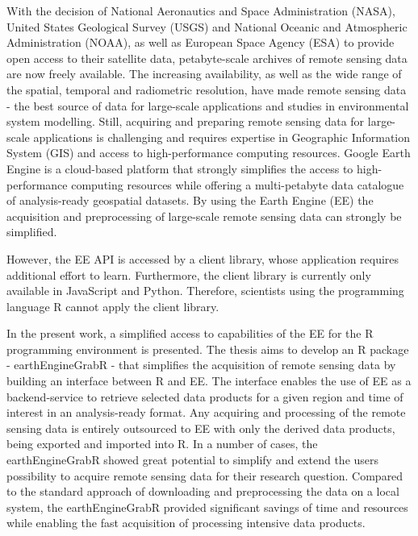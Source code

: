 
With the decision of National Aeronautics and Space Administration (NASA), United States Geological Survey (USGS) and National Oceanic and Atmospheric Administration (NOAA), as well as European Space Agency (ESA) to provide open access to their satellite data, petabyte-scale archives of remote sensing data are now freely available.
The increasing availability, as well as the wide range of the spatial, temporal  and radiometric resolution, have made remote sensing data - the best source of data for large-scale applications and studies in environmental system modelling.
Still, acquiring and preparing remote sensing data for large-scale applications is challenging and requires expertise in Geographic Information System (GIS) and access to high-performance computing resources.
Google Earth Engine is a cloud-based platform that strongly simplifies the access to high-performance computing resources while offering a multi-petabyte data catalogue of analysis-ready geospatial datasets.
By using the Earth Engine (EE) the acquisition and preprocessing of large-scale remote sensing data can strongly be simplified.

However, the EE API is accessed by a client library, whose application requires additional effort to learn. Furthermore, the client library is currently only available in JavaScript and Python. Therefore, scientists using the programming language R cannot apply the client library.

In the present work, a simplified access to capabilities of the EE for the R programming environment is presented.
The thesis aims to develop an R package - earthEngineGrabR - that simplifies the acquisition of remote sensing data by building an interface between R and EE. The interface enables the use of  EE as a backend-service to retrieve selected data products for a given region and time of interest in an analysis-ready format. Any acquiring and processing of the remote sensing data is entirely outsourced to EE with only the derived data products, being exported and imported into R. In a number of cases, the earthEngineGrabR showed great potential to simplify and extend the users possibility to acquire remote sensing data for their research question. Compared to the standard approach of downloading and preprocessing the data on a local system, the earthEngineGrabR provided significant savings of time and resources while enabling the fast acquisition of processing intensive data products.


 
